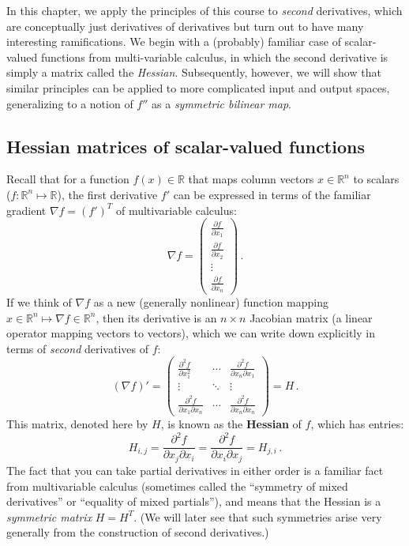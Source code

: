 In this chapter, we apply the principles of this course to \emph{second} derivatives, which are conceptually just derivatives of derivatives but turn out to have many interesting ramifications.  We begin with a (probably) familiar case of scalar-valued functions from multi-variable calculus, in which the second derivative is simply a matrix called the \emph{Hessian}.  Subsequently, however, we will show that similar principles can be applied to more complicated input and output spaces, generalizing to a notion of $f''$ as a \emph{symmetric bilinear map}.

\subsection{Hessian matrices of scalar-valued functions}
\label{sec:Hessian-scalar}

Recall that for a function $f(x) \in \mathbb{R}$ that maps column vectors $x \in \mathbb{R}^n$ to scalars ($f: \mathbb{R}^n \mapsto \mathbb{R}$), the first derivative $f'$ can be expressed in terms of the familiar gradient $\nabla f = (f')^T$ of multivariable calculus:
$$
\nabla f = \begin{pmatrix} \frac{\partial f}{\partial x_1} \\ \frac{\partial f}{\partial x_2} \\ \vdots \\ \frac{\partial f}{\partial x_n}
\end{pmatrix} \, .
$$
If we think of $\nabla f$ as a new (generally nonlinear) function mapping $x \in \mathbb{R}^n \mapsto \nabla f \in \mathbb{R}^n$, then its derivative is an $n \times n$ Jacobian matrix (a linear operator mapping vectors to vectors), which we can write down explicitly in terms of \emph{second} derivatives of $f$:
$$
  (\nabla f)' =
\begin{pmatrix}
   \frac{\partial^2 f}{ \partial x_1^2} & \cdots & \frac{\partial^2 f}{\partial x_n \partial x_1} \\
        \vdots  &\ddots & \vdots \\
        \frac{\partial^2 f}{\partial x_1 \partial x_n} & \cdots & \frac{\partial^2 f}{\partial x_n \partial x_n}
    \end{pmatrix} = H \, .
$$
This matrix, denoted here by $H$, is known as the \textbf{Hessian} of $f$, which has entries:
\[
H_{i,j} = \frac{\partial^2 f}{ \partial x_j \partial x_i} = \frac{\partial^2 f}{ \partial x_i \partial x_j} = H_{j,i}  \, .
\]
The fact that you can take partial derivatives in either order is a familiar fact from multivariable calculus (sometimes called the ``symmetry of mixed derivatives'' or ``equality of mixed partials''), and means that the Hessian is a \emph{symmetric matrix} $H = H^T$.  (We will later see that such symmetries arise very generally from the construction of second derivatives.)

